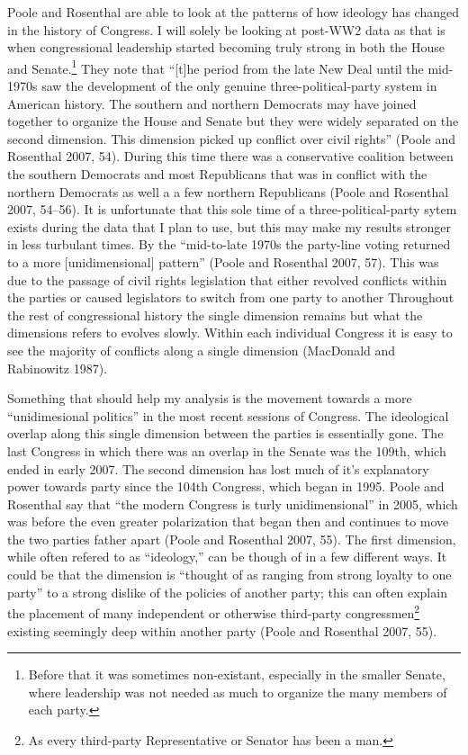 \documentclass[12pt,twoside]{reedthesis}
\begin{document}
  Poole and Rosenthal are able to look at the patterns of how ideology has
  changed in the history of Congress. I will solely be looking at post-WW2
  data as that is when congressional leadership started becoming truly
  strong in both the House and Senate.\footnote{Before that it was
    sometimes non-existant, especially in the smaller Senate, where
    leadership was not needed as much to organize the many members of each
    party.} They note that ``{[}t{]}he period from the late New Deal until
  the mid-1970s saw the development of the only genuine
  three-political-party system in American history. The southern and
  northern Democrats may have joined together to organize the House and
  Senate but they were widely separated on the second dimension. This
  dimension picked up conflict over civil rights'' (Poole and Rosenthal
  2007, 54). During this time there was a conservative coalition between
  the southern Democrats and most Republicans that was in conflict with
  the northern Democrats as well a a few northern Republicans (Poole and
  Rosenthal 2007, 54--56). It is unfortunate that this sole time of a
  three-political-party sytem exists during the data that I plan to use,
  but this may make my results stronger in less turbulant times. By the
  ``mid-to-late 1970s the party-line voting returned to a more
  {[}unidimensional{]} pattern'' (Poole and Rosenthal 2007, 57). This was
  due to the passage of civil rights legislation that either revolved
  conflicts within the parties or caused legislators to switch from one
  party to another Throughout the rest of congressional history the single
  dimension remains but what the dimensions refers to evolves slowly.
  Within each individual Congress it is easy to see the majority of
  conflicts along a single dimension (MacDonald and Rabinowitz 1987).
  
  Something that should help my analysis is the movement towards a more
  ``unidimesional politics'' in the most recent sessions of Congress. The
  ideological overlap along this single dimension between the parties is
  essentially gone. The last Congress in which there was an overlap in the
  Senate was the 109th, which ended in early 2007. The second dimension
  has lost much of it's explanatory power towards party since the 104th
  Congress, which began in 1995. Poole and Rosenthal say that ``the modern
  Congress is turly unidimensional'' in 2005, which was before the even
  greater polarization that began then and continues to move the two
  parties father apart (Poole and Rosenthal 2007, 55). The first
  dimension, while often refered to as ``ideology,'' can be though of in a
  few different ways. It could be that the dimension is ``thought of as
  ranging from strong loyalty to one party'' to a strong dislike of the
  policies of another party; this can often explain the placement of many
  independent or otherwise third-party congressmen\footnote{As every
    third-party Representative or Senator has been a man.} existing
  seemingly deep within another party (Poole and Rosenthal 2007, 55).
  
\end{document}
